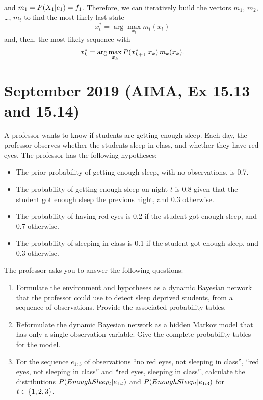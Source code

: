 \documentclass[11pt, a4paper]{article}
\begin{document}
\begin{enumerate}
\begin{solution}
\begin{align*}
        \end{align*}
        and $m_1 = P(X_1 \vert e_1) = f_1$. Therefore, we can iteratively build the vectors $m_1$, $m_2$, \dots, $m_t$ to find the most likely last state
        \begin{equation*}
            x_t^* = \arg \max_{x_t} m_t(x_t)
        \end{equation*}
        and, then, the most likely sequence with
        \begin{equation*}
            x_k^* = \arg \max_{x_k} P(x^*_{k + 1} \vert x_k) \, m_k(x_k) .
        \end{equation*}
    \end{solution}
    
\end{enumerate}

\newpage

\section{September 2019 (AIMA, Ex 15.13 and 15.14)}

A professor wants to know if students are getting enough sleep. Each day, the professor observes whether the students sleep in class, and whether they have red eyes. The professor has the following hypotheses:
\begin{itemize}
    \item The prior probability of getting enough sleep, with no observations, is \num{0.7}.
    \item The probability of getting enough sleep on night $t$ is \num{0.8} given that the student got enough sleep the previous night, and \num{0.3} otherwise.
    \item The probability of having red eyes is \num{0.2} if the student got enough sleep, and \num{0.7} otherwise.
    \item The probability of sleeping in class is \num{0.1} if the student got enough sleep, and \num{0.3} otherwise.
\end{itemize}
The professor asks you to answer the following questions:

\begin{enumerate}
    \item Formulate the environment and hypotheses as a dynamic Bayesian network that the professor could use to detect sleep deprived students, from a sequence of observations. Provide the associated probability tables.

    \item Reformulate the dynamic Bayesian network as a hidden Markov model that has only a single observation variable. Give the complete probability tables for the model.

    \item For the sequence $e_{1:3}$ of observations \enquote{no red eyes, not sleeping in class}, \enquote{red eyes, not sleeping in class} and 
    \enquote{red eyes, sleeping in class}, calculate the distributions $P(EnoughSleep_t \vert e_{1:t})$ and $P(EnoughSleep_t \vert e_{1:3})$ for $t \in \{1, 2, 3\}$.
\end{enumerate}
\end{document}
